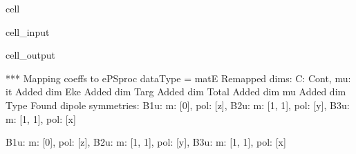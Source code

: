 \documentclass[letterpaper,table,10pt,english]{jupyterBook}
\begin{document}
\begin{sphinxuseclass}{cell}\begin{sphinxVerbatimInput}

\begin{sphinxuseclass}{cell_input}
\begin{sphinxVerbatim}[commandchars=\\\{\}]

   

  

  

\PYG{p}{[}\PYG{p}{]}
\end{sphinxVerbatim}

\end{sphinxuseclass}\end{sphinxVerbatimInput}
\begin{sphinxVerbatimOutput}

\begin{sphinxuseclass}{cell_output}
\begin{sphinxVerbatim}[commandchars=\\\{\}]
*** Mapping coeffs to ePSproc dataType = matE
Remapped dims: \PYGZob{}\PYGZsq{}C\PYGZsq{}: \PYGZsq{}Cont\PYGZsq{}, \PYGZsq{}mu\PYGZsq{}: \PYGZsq{}it\PYGZsq{}\PYGZcb{}
Added dim Eke
Added dim Targ
Added dim Total
Added dim mu
Added dim Type
Found dipole symmetries: 
\PYGZob{}\PYGZsq{}B1u\PYGZsq{}: \PYGZob{}\PYGZsq{}m\PYGZsq{}: [0], \PYGZsq{}pol\PYGZsq{}: [\PYGZsq{}z\PYGZsq{}]\PYGZcb{}, \PYGZsq{}B2u\PYGZsq{}: \PYGZob{}\PYGZsq{}m\PYGZsq{}: [\PYGZhy{}1, 1], \PYGZsq{}pol\PYGZsq{}: [\PYGZsq{}y\PYGZsq{}]\PYGZcb{}, \PYGZsq{}B3u\PYGZsq{}: \PYGZob{}\PYGZsq{}m\PYGZsq{}: [\PYGZhy{}1, 1], \PYGZsq{}pol\PYGZsq{}: [\PYGZsq{}x\PYGZsq{}]\PYGZcb{}\PYGZcb{}
\end{sphinxVerbatim}

\begin{sphinxVerbatim}[commandchars=\\\{\}]
\PYGZob{}\PYGZsq{}B1u\PYGZsq{}: \PYGZob{}\PYGZsq{}m\PYGZsq{}: [0], \PYGZsq{}pol\PYGZsq{}: [\PYGZsq{}z\PYGZsq{}]\PYGZcb{},
 \PYGZsq{}B2u\PYGZsq{}: \PYGZob{}\PYGZsq{}m\PYGZsq{}: [\PYGZhy{}1, 1], \PYGZsq{}pol\PYGZsq{}: [\PYGZsq{}y\PYGZsq{}]\PYGZcb{},
 \PYGZsq{}B3u\PYGZsq{}: \PYGZob{}\PYGZsq{}m\PYGZsq{}: [\PYGZhy{}1, 1], \PYGZsq{}pol\PYGZsq{}: [\PYGZsq{}x\PYGZsq{}]\PYGZcb{}\PYGZcb{}
\end{sphinxVerbatim}

\end{sphinxuseclass}\end{sphinxVerbatimOutput}

\end{sphinxuseclass}
\end{document}
